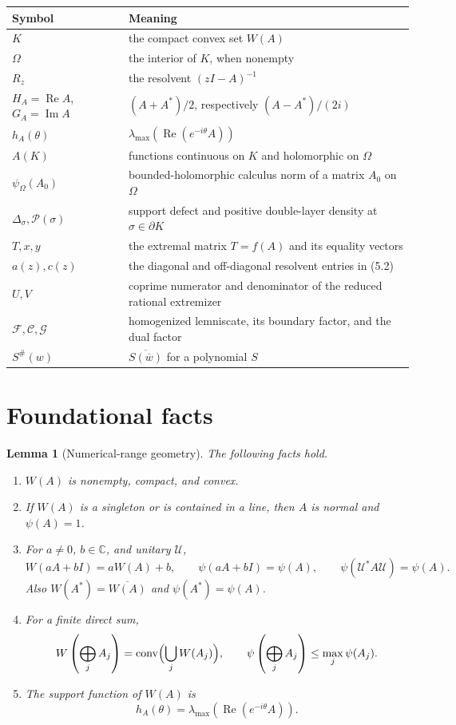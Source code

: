 \documentclass[11pt]{article}
\newtheorem{lemma}[theorem]{Lemma}
\theoremstyle{definition}
\theoremstyle{remark}
\newcommand{\C}{\mathbb C}
\newcommand{\conv}{\operatorname{conv}}
\newcommand{\Rea}{\operatorname{Re}}
\newcommand{\Ima}{\operatorname{Im}}
\begin{document}
\begin{center}
\begin{tabular}{@{}p{}p{}@{}}
\toprule
Symbol & Meaning\\
\midrule
\(K\) & the compact convex set \(W(A)\)\\
\(\Omega\) & the interior of \(K\), when nonempty\\
\(R_z\) & the resolvent \((zI-A)^{-1}\)\\
\(H_A=\Rea A\), \(G_A=\Ima A\) & \((A+A^*)/2\), respectively \((A-A^*)/(2i)\)\\
\(h_A(\theta)\) & \(\lambda_{\max}(\Rea(e^{-i\theta}A))\)\\
\(A(K)\) & functions continuous on \(K\) and holomorphic on \(\Omega\)\\
\(\psi_\Omega(A_0)\) & bounded-holomorphic calculus norm of a matrix \(A_0\) on \(\Omega\)\\
\(\Delta_\sigma,\mathcal P(\sigma)\) & support defect and positive double-layer density at \(\sigma\in\partial K\)\\
\(T,x,y\) & the extremal matrix \(T=f(A)\) and its equality vectors\\
\(a(z),c(z)\) & the diagonal and off-diagonal resolvent entries in (5.2)\\
\(U,V\) & coprime numerator and denominator of the reduced rational extremizer\\
\(\mathscr F,\mathscr C,\mathscr G\) & homogenized lemniscate, its boundary factor, and the dual factor\\
\(S^\#(w)\) & \(\overline{S(\overline w)}\) for a polynomial \(S\)\\
\bottomrule
\end{tabular}
\end{center}

\section{Foundational facts}

\begin{lemma}[Numerical-range geometry]\label{lem:foundation}
The following facts hold.
\begin{enumerate}
\item \(W(A)\) is nonempty, compact, and convex.
\item If \(W(A)\) is a singleton or is contained in a line, then \(A\) is
normal and \(\psi(A)=1\).
\item For \(a\neq0\), \(b\in\C\), and unitary \(\mathcal U\),
\[
 W(aA+bI)=aW(A)+b,\qquad \psi(aA+bI)=\psi(A),\qquad
 \psi(\mathcal U^*A\mathcal U)=\psi(A).
\]
Also \(W(A^*)=\overline{W(A)}\) and \(\psi(A^*)=\psi(A)\).
\item For a finite direct sum,
\[
 W\left(\bigoplus_jA_j\right)=\conv\Bigl(\bigcup_jW(A_j)\Bigr),
 \qquad
 \psi\left(\bigoplus_jA_j\right)\leq\max_j\psi(A_j).
\]
\item The support function of \(W(A)\) is
\[
 h_A(\theta)=\lambda_{\max}\!\left(\Rea(e^{-i\theta}A)\right).
\]
\end{enumerate}
\end{lemma}
\end{document}
